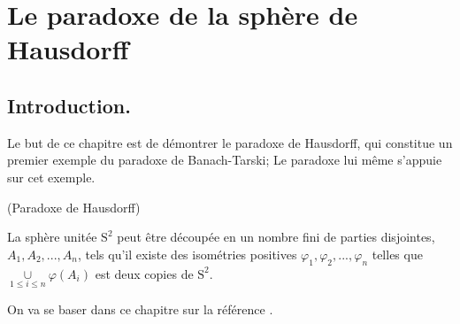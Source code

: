 \chapter{Le paradoxe de la sphère de Hausdorff}
\section{Introduction.}
\noindent
Le but de ce chapitre est de démontrer le paradoxe de Hausdorff, qui constitue un premier exemple du paradoxe de Banach-Tarski; Le paradoxe lui même s'appuie sur cet exemple.

\begin{theorem}(Paradoxe de Hausdorff)
  \hfill

  La sphère unitée $\mathrm{S}^2$ peut être découpée en un nombre fini de parties disjointes, $A_1,A_2,...,A_n$, tels qu'il existe des isométries positives $\varphi_1, \varphi_2, ..., \varphi_n$ telles que $\underset{1\le i\le n}{\cup} \varphi(A_i)$ est deux copies de $\mathrm{S}^2$.
  \label{But}
\end{theorem}
\noindent
On va se baser dans ce chapitre sur la référence \cite{cite1}.







% 
% 
